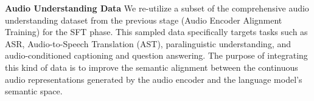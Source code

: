 \documentclass{article}
\begin{document}


\textbf{Audio Understanding Data}
We re-utilize a subset of the comprehensive audio understanding dataset from the previous stage (Audio Encoder Alignment Training) for the SFT phase. This sampled data specifically targets tasks such as ASR, Audio-to-Speech Translation (AST), paralinguistic understanding, and audio-conditioned captioning and question answering. The purpose of integrating this kind of data is to improve the semantic alignment between the continuous audio representations generated by the audio encoder and the language model's semantic space.
\end{document}
